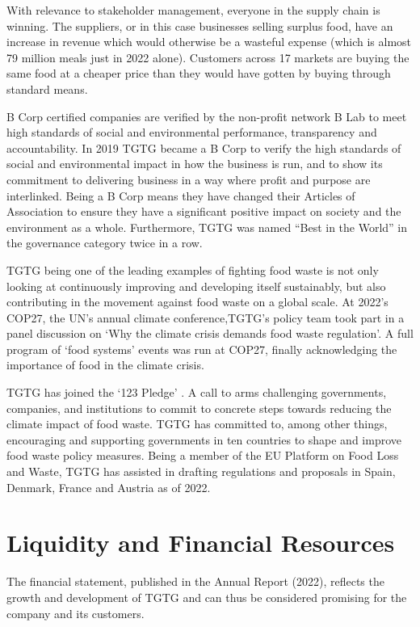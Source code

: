 \documentclass{article}
\begin{document}
With relevance to stakeholder management, everyone in the supply chain is
winning. The suppliers, or in this case businesses selling surplus food, have
an increase in revenue which would otherwise be a wasteful expense (which is
almost 79 million meals just in 2022 alone). Customers across 17 markets are
buying the same food at a cheaper price than they would have gotten by buying
through standard means. 

B Corp certified companies are verified by the non-profit network B Lab to meet
high standards of social and environmental performance, transparency and
accountability. \cite{blab} In 2019 TGTG became a B Corp to verify the high
standards of social and environmental impact in how the business is run, and to
show its commitment to delivering business in a way where profit and purpose
are interlinked. Being a B Corp means they have changed their Articles of
Association to ensure they have a significant positive impact on society and
the environment as a whole. Furthermore, TGTG was named “Best in the World” in
the governance category twice in a row. \cite{impact}

TGTG being one of the leading examples of fighting food waste is not only
looking at continuously improving and developing itself sustainably, but also
contributing in the movement against food waste on a global scale. At 2022’s
COP27, the UN’s annual climate conference,TGTG’s policy team took part in a
panel discussion on ‘Why the climate crisis demands food waste regulation’. A
full program of ‘food systems’ events was run at COP27, finally acknowledging
the importance of food in the climate crisis.

TGTG has joined the ‘123 Pledge’ \cite{unep}. A call to arms challenging
governments, companies, and institutions to commit to concrete steps towards
reducing the climate impact of food waste. TGTG has committed to, among other
things, encouraging and supporting governments in ten countries to shape and
improve food waste policy measures. Being a member of the EU Platform on Food
Loss and Waste, TGTG has assisted in drafting regulations and proposals in
Spain, Denmark, France and Austria as of 2022.

\section{Liquidity and Financial Resources}

The financial statement, published in the Annual Report (2022), reflects the
growth and development of TGTG and can thus be considered promising for the
company and its customers.
\end{document}

